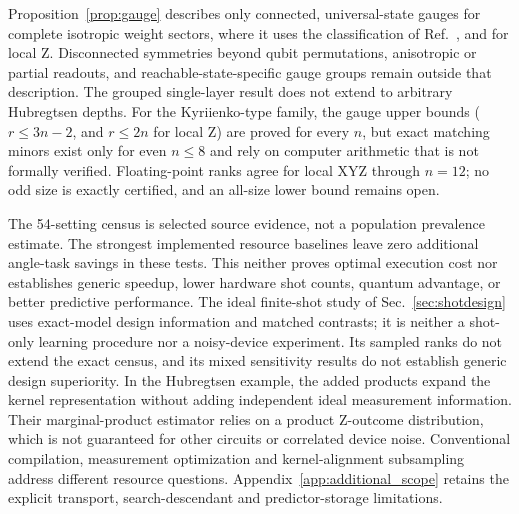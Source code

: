 \documentclass[a4paper,twocolumn,11pt,unpublished]{quantumarticle}
\begin{document}
Proposition~\ref{prop:gauge} describes only connected, universal-state
gauges for complete isotropic weight sectors, where it uses the
classification of Ref.~\cite{cpr2019locality}, and for local Z.
Disconnected symmetries beyond qubit permutations, anisotropic or
partial readouts, and reachable-state-specific gauge groups remain
outside that description. The grouped
single-layer result does not extend to arbitrary Hubregtsen depths.
For the Kyriienko-type family, the gauge upper bounds ($r\le3n-2$, and
$r\le2n$ for local Z) are proved for every $n$, but exact matching
minors exist only for even $n\le8$ and rely on computer arithmetic
that is not formally verified. Floating-point ranks agree for local
XYZ through $n=12$; no odd size is exactly certified, and an all-size
lower bound remains open.

The 54-setting census is selected source evidence, not a population
prevalence estimate. The strongest implemented resource baselines leave
zero additional angle-task savings in these tests. This neither proves
optimal execution cost nor establishes generic speedup, lower hardware
shot counts, quantum advantage, or better predictive performance.
The ideal finite-shot study of Sec.~\ref{sec:shotdesign} uses exact-model
design information and matched contrasts; it is neither a shot-only
learning procedure nor a noisy-device experiment. Its sampled ranks
do not extend the exact census, and its mixed sensitivity results do
not establish generic design superiority. In the Hubregtsen example,
the added products expand the kernel representation without adding
independent ideal measurement information. Their marginal-product
estimator relies on a product Z-outcome distribution, which is not
guaranteed for other circuits or correlated device noise. Conventional
compilation, measurement optimization and kernel-alignment subsampling
\cite{sahin2024subsampling} address different resource questions.
Appendix~\ref{app:additional_scope} retains the explicit transport,
search-descendant and predictor-storage limitations.
\end{document}
